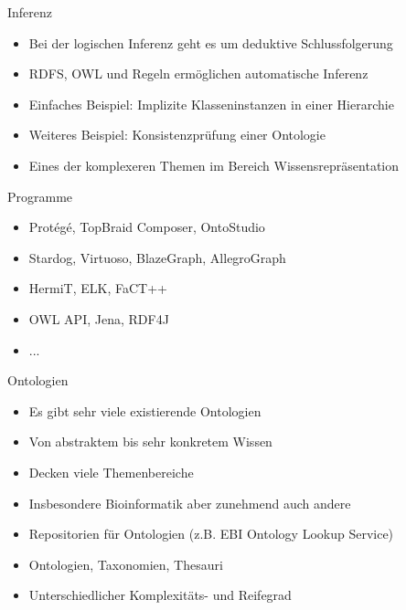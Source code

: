 \documentclass{beamer}
\begin{document}
\begin{frame}{Inferenz}
	
	\begin{itemize}
		\item Bei der logischen Inferenz geht es um deduktive Schlussfolgerung
		\item RDFS, OWL und Regeln ermöglichen automatische Inferenz
		\item Einfaches Beispiel: Implizite Klasseninstanzen in einer Hierarchie
		\item Weiteres Beispiel: Konsistenzprüfung einer Ontologie
		\item Eines der komplexeren Themen im Bereich Wissensrepräsentation
	\end{itemize}
	
\end{frame}

\begin{frame}{Programme}
	
	\begin{itemize}
		\item Prot{\'e}g{\'e}, TopBraid Composer, OntoStudio
		\item Stardog, Virtuoso, BlazeGraph, AllegroGraph
		\item HermiT, ELK, FaCT++
		\item OWL API, Jena, RDF4J
		\item ...
	\end{itemize}
	
\end{frame}

\begin{frame}{Ontologien}
	
	\begin{itemize}
		\item Es gibt sehr viele existierende Ontologien
		\item Von abstraktem bis sehr konkretem Wissen
		\item Decken viele Themenbereiche
		\item Insbesondere Bioinformatik aber zunehmend auch andere
		\item Repositorien für Ontologien (z.B. EBI Ontology Lookup Service)
		\item Ontologien, Taxonomien, Thesauri
		\item Unterschiedlicher Komplexitäts- und Reifegrad
	\end{itemize}
	
\end{frame}
\end{document}

